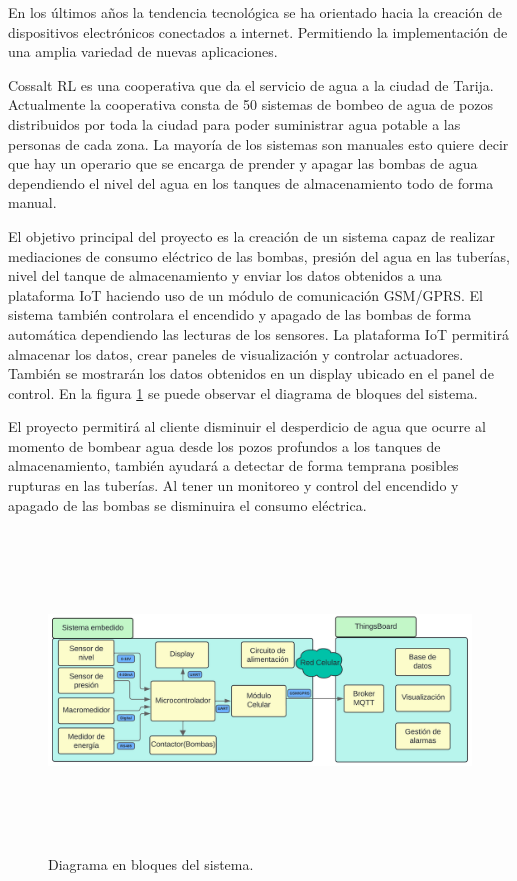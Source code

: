 \documentclass[
11pt, %
codirector, %
]{charter}
\begin{document}
En los últimos años la tendencia tecnológica se ha orientado hacia la creación de dispositivos electrónicos conectados a internet. Permitiendo la implementación de una amplia variedad de nuevas aplicaciones.

Cossalt RL es una cooperativa que da el servicio de agua a la ciudad de Tarija. Actualmente la cooperativa consta de 50 sistemas de bombeo de agua de pozos distribuidos por toda la ciudad para poder suministrar agua potable a las personas de cada zona. La mayoría de los sistemas son manuales esto quiere decir que hay un operario que se encarga de prender y apagar las bombas de agua dependiendo el nivel del agua en los tanques de almacenamiento todo de forma manual.

El objetivo principal del proyecto es la creación de un sistema capaz de realizar mediaciones de consumo eléctrico de las bombas, presión del agua en las tuberías, nivel del tanque de almacenamiento y enviar los datos obtenidos a una plataforma IoT haciendo uso de un módulo de comunicación GSM/GPRS. El sistema también controlara el encendido y apagado de las bombas de forma automática dependiendo las lecturas de los sensores. La plataforma IoT permitirá almacenar los datos, crear paneles de visualización y controlar actuadores. También se mostrarán los datos obtenidos en un display ubicado en el panel de control.
En la figura \ref{fig:diagra_sistema} se puede observar el diagrama de bloques del sistema.

El proyecto permitirá al cliente disminuir el desperdicio de agua que ocurre al momento de bombear agua desde los pozos profundos a los tanques de almacenamiento, también ayudará a detectar de forma temprana posibles rupturas en las tuberías. Al tener un monitoreo y control del encendido y apagado de las bombas se disminuira el consumo eléctrica.

\begin{figure}[hpb]
	\centering 
	\includegraphics[width=15cm, height=8.5cm]{./Figuras/d_sistema.png}
	\caption{Diagrama en bloques del sistema.}
	\label{fig:diagra_sistema}
\end{figure}
\vspace{2cm}
\end{document}
